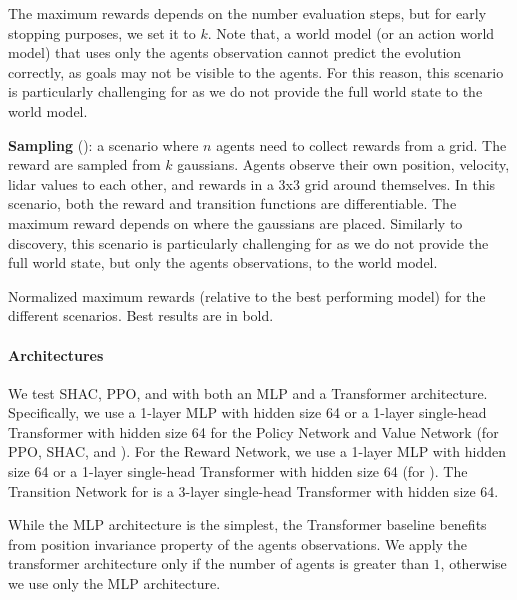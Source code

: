 \begin{compactitem}
         The maximum rewards depends on the number evaluation steps, but for early stopping purposes, we set it to $k$. 
         Note that, a world model (or an action world model) that uses only the agents observation cannot predict the evolution correctly, as goals may not be visible to the agents. For this reason, this scenario is particularly challenging for \fname{} as we do not provide the full world state to the world model.
     \item \textbf{Sampling} (): 
         a scenario where $n$ agents need to collect rewards from a grid. The reward are sampled from $k$ gaussians. Agents observe their own position, velocity, lidar values to each other, and rewards in a 3x3 grid around themselves.  
         In this scenario, both the reward and transition functions are differentiable. 
         The maximum reward depends on where the gaussians are placed.
         Similarly to discovery, this scenario is particularly challenging for \fname{} as we do not provide the full world state, but only the agents observations, to the world model.
\end{compactitem}

\begin{table}[!t]
    \centering
    
    \caption{Normalized maximum rewards (relative to the best performing model) for the different scenarios. Best results are in bold.}\label{tab:max-rewards}
\end{table}

\paragraph{Architectures}
We test SHAC, PPO, and \fname{} with both an MLP and a Transformer architecture. Specifically, we use a 1-layer MLP with hidden size 64 or a 1-layer single-head Transformer with hidden size 64 for the Policy Network and Value Network (for PPO, SHAC, and \fname{}). For the Reward Network, we use a 1-layer MLP with hidden size 64 or a 1-layer single-head Transformer with hidden size 64 (for \fname{}). The Transition Network for \fname{} is a 3-layer single-head Transformer with hidden size 64.

While the MLP architecture is the simplest, the Transformer baseline benefits from position invariance property of the agents observations. We apply the transformer architecture only if the number of agents is greater than $1$, otherwise we use only the MLP architecture. 


